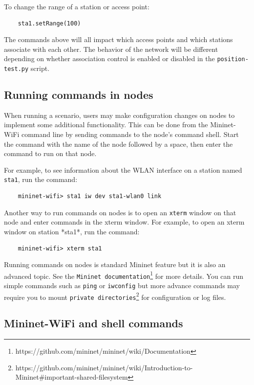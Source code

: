 \noindent To change the range of a station or access point:

\begin{verbatim}
    sta1.setRange(100)
\end{verbatim}    

The commands above will all impact which access points and which stations associate with each other. The behavior of the network will be different depending on whether association control is enabled or disabled in the \texttt{position-test.py} script.

\subsection{Running commands in nodes}

When running a scenario, users may make configuration changes on nodes to implement some additional functionality. This can be done from the Mininet-WiFi command line by sending commands to the node's command shell. Start the command with the name of the node followed by a space, then enter the command to run on that node.

\noindent For example, to see information about the WLAN interface on a station named \texttt{sta1}, run the command:

\begin{verbatim}
    mininet-wifi> sta1 iw dev sta1-wlan0 link
\end{verbatim}
    

\noindent Another way to run commands on nodes is to open an \texttt{xterm} window on that node and enter commands in the xterm window. For example, to open an xterm window on station *sta1*, run the command:

\begin{verbatim}
    mininet-wifi> xterm sta1
\end{verbatim}
    

\noindent Running commands on nodes is standard Mininet feature but it is also an advanced topic. See the \texttt{Mininet documentation}\footnote{https://github.com/mininet/mininet/wiki/Documentation} for more details. You can run simple commands such as \texttt{ping} or \texttt{iwconfig} but more advance commands may require you to mount \texttt{private directories}\footnote{https://github.com/mininet/mininet/wiki/Introduction-to-Mininet\#important-shared-filesystem} for configuration or log files.

\subsection{Mininet-WiFi and shell commands}

